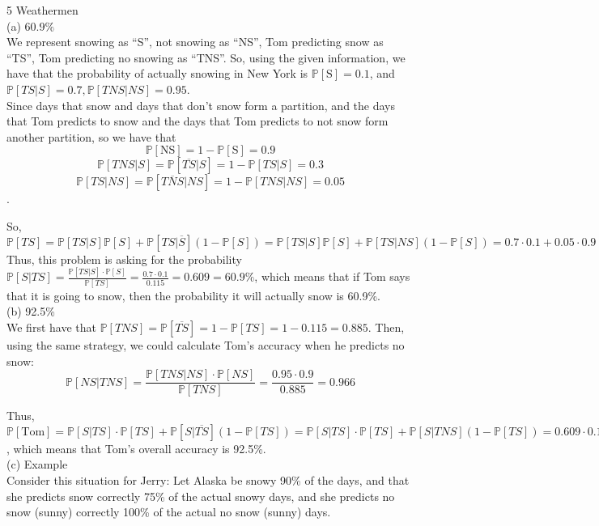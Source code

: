 \documentclass{article}
\begin{document}
{\Large 5 Weathermen} \\[.5cm]
{\color{red} (a) $60.9\%$} \\

We represent snowing as ``S'', not snowing as ``NS'', Tom predicting snow as ``TS'', Tom predicting no snowing as ``TNS''. So, using the given information, we have that the probability of actually snowing in New York is $\mathbb{P}[\text{S}] = 0.1$, and $\mathbb{P}[TS|S] = 0.7, \mathbb{P}[TNS|NS] = 0.95$. \\

Since days that snow and days that don't snow form a partition, and the days that Tom predicts to snow and the days that Tom predicts to not snow form another partition, so we have that
$$\mathbb{P}[\text{NS}] = 1 - \mathbb{P}[\text{S}] = 0.9$$
$$\mathbb{P}[TNS|S] = \mathbb{P}[\overline{TS}|S] = 1 - \mathbb{P}[TS|S] = 0.3$$
$$\mathbb{P}[TS|NS] = \mathbb{P}[\overline{TNS}|NS] = 1 - \mathbb{P}[TNS|NS] = 0.05$$.

So, $\mathbb{P}[TS] =
\mathbb{P}[TS|S]\mathbb{P}[S] + \mathbb{P}[TS|\overline{S}](1-\mathbb{P}[S]) =
\mathbb{P}[TS|S]\mathbb{P}[S] + \mathbb{P}[TS|NS](1-\mathbb{P}[S]) =
0.7\cdot0.1 + 0.05\cdot0.9 = 0.115$ \\

Thus, this problem is asking for the probability $\mathbb{P}[S|TS] = \frac{\mathbb{P}[TS|S]\cdot\mathbb{P}[S]}{\mathbb{P}[TS]} = \frac{0.7\cdot0.1}{0.115} = 0.609 = 60.9\%$, which means that if Tom says that it is going to snow, then the probability it will actually snow is 60.9\%. \\[.5cm]
{\color{red} (b) 92.5\%} \\

We first have that $\mathbb{P}[TNS] = \mathbb{P}[\overline{TS}] = 1 - \mathbb{P}[TS] = 1 - 0.115 = 0.885$. Then, using the same strategy, we could calculate Tom's accuracy when he predicts no snow: $$\mathbb{P}[NS|TNS] = \frac{\mathbb{P}[TNS|NS]\cdot \mathbb{P}[NS]}{\mathbb{P}[TNS]} = 
\frac{0.95\cdot0.9}{0.885} = 0.966$$

Thus, $\mathbb{P}[\text{Tom}] = \mathbb{P}[S|TS]\cdot\mathbb{P}[TS] + \mathbb{P}[S|\overline{TS}](1 - \mathbb{P}[TS]) = 
\mathbb{P}[S|TS]\cdot\mathbb{P}[TS] + \mathbb{P}[S|TNS](1 - \mathbb{P}[TS]) = 
0.609\cdot0.115 + 0.966\cdot0.885 = 0.925 = 92.5\%$, which means that Tom's overall accuracy is 92.5\%. \\[.5cm]
{\color{red} (c) Example} \\

Consider this situation for Jerry: Let Alaska be snowy 90\% of the days, and that she predicts snow correctly 75\% of the actual snowy days, and she predicts no snow (sunny) correctly 100\% of the actual no snow (sunny) days. \\
\end{document}
